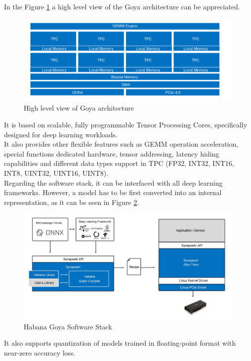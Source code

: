In the Figure \ref{fig:goyaarch} a high level view of the Goya architecture can be appreciated.
\begin{figure}[H]
\centering
\captionsetup{justification=centering}
\includegraphics[scale=0.7]{./figure/goya_arch.PNG}
\caption{High level view of Goya architecture}
\label{fig:goyaarch}
\end{figure}

It is based on scalable, fully programmable Tensor Processing Cores, specifically designed for deep learning workloads. \\
It also provides other flexible features such as GEMM operation acceleration, special functions dedicated hardware, tensor addressing, latency hiding capabilities and different data types support in TPC (FP32, INT32, INT16, INT8, UINT32, UINT16, UINT8).\\

Regarding the software stack, it can be interfaced with all deep learning frameworks. However, a model has to be first converted into an internal representation, as it can be seen in Figure \ref{fig:goyaswstack}.
\begin{figure}[H]
\centering
\captionsetup{justification=centering}
\includegraphics[scale=0.5]{./figure/goya_sw_stack.PNG}
\caption{Habana Goya Software Stack}
\label{fig:goyaswstack}
\end{figure}
It also supports quantization of models trained in floating-point format with near-zero accuracy loss.